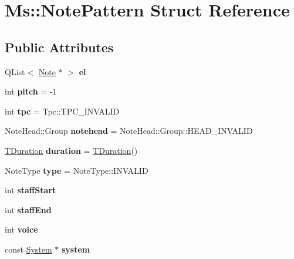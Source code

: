 \hypertarget{struct_ms_1_1_note_pattern}{}\section{Ms\+:\+:Note\+Pattern Struct Reference}
\label{struct_ms_1_1_note_pattern}
\subsection*{Public Attributes}
\begin{DoxyCompactItemize}
\item 
\mbox{\label{struct_ms_1_1_note_pattern_a7cbd7c88690186979694a9ebb1491c02}} 
Q\+List$<$ \hyperlink{class_ms_1_1_note}{Note} $\ast$ $>$ {\bfseries el}
\item 
\mbox{\label{struct_ms_1_1_note_pattern_affcc2dbd64a103557cd6374dc2bfd281}} 
int {\bfseries pitch} = -\/1
\item 
\mbox{\label{struct_ms_1_1_note_pattern_abcbec91b0e366d3307129718a5d592f2}} 
int {\bfseries tpc} = Tpc\+::\+T\+P\+C\+\_\+\+I\+N\+V\+A\+L\+ID
\item 
\mbox{\label{struct_ms_1_1_note_pattern_a4e59d4d7b5f94bb0ed947efa2f17018d}} 
Note\+Head\+::\+Group {\bfseries notehead} = Note\+Head\+::\+Group\+::\+H\+E\+A\+D\+\_\+\+I\+N\+V\+A\+L\+ID
\item 
\mbox{\label{struct_ms_1_1_note_pattern_a4501fea6bf4c09a218da12ce13a694d9}} 
\hyperlink{class_ms_1_1_t_duration}{T\+Duration} {\bfseries duration} = \hyperlink{class_ms_1_1_t_duration}{T\+Duration}()
\item 
\mbox{\label{struct_ms_1_1_note_pattern_a4f0def8a04648fc79da6d0b6a34830af}} 
Note\+Type {\bfseries type} = Note\+Type\+::\+I\+N\+V\+A\+L\+ID
\item 
\mbox{\label{struct_ms_1_1_note_pattern_a25e08ed8d485feb5cddbc765d29860fc}} 
int {\bfseries staff\+Start}
\item 
\mbox{\label{struct_ms_1_1_note_pattern_abe5fa55ac01549c2f3313b877269873e}} 
int {\bfseries staff\+End}
\item 
\mbox{\label{struct_ms_1_1_note_pattern_aea3d3043b8e94526a9eeddc053950381}} 
int {\bfseries voice}
\item 
\mbox{\label{struct_ms_1_1_note_pattern_a41c123496c69738a7fb4fe7dcf44fe01}} 
const \hyperlink{class_ms_1_1_system}{System} $\ast$ {\bfseries system}
\end{DoxyCompactItemize}


